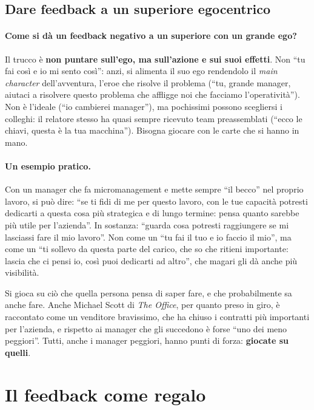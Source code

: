 \subsection{Dare feedback a un superiore egocentrico}

\paragraph{Come si dà un feedback negativo a un superiore con un grande ego?}
Il trucco è \textbf{non puntare sull'ego, ma sull'azione e sui suoi effetti}.
Non ``tu fai così e io mi sento così'': anzi, si alimenta il suo ego
rendendolo il \emph{main character} dell'avventura, l'eroe che risolve il
problema (``tu, grande manager, aiutaci a risolvere questo problema che
affligge noi che facciamo l'operatività''). Non è l'ideale (``io cambierei
manager''), ma pochissimi possono scegliersi i colleghi: il relatore stesso ha
quasi sempre ricevuto team preassemblati (``ecco le chiavi, questa è la tua
macchina''). Bisogna giocare con le carte che si hanno in mano.

\paragraph{Un esempio pratico.} Con un manager che fa micromanagement e mette
sempre ``il becco'' nel proprio lavoro, si può dire: ``se ti fidi di me per
questo lavoro, con le tue capacità potresti dedicarti a questa cosa più
strategica e di lungo termine: pensa quanto sarebbe più utile per l'azienda''.
In sostanza: ``guarda cosa potresti raggiungere se mi lasciassi fare il mio
lavoro''. Non come un ``tu fai il tuo e io faccio il mio'', ma come un
``ti sollevo da questa parte del carico, che so che ritieni importante: lascia
che ci pensi io, così puoi dedicarti ad altro'', che magari gli dà anche più
visibilità.

Si gioca su ciò che quella persona pensa di saper fare, e che probabilmente sa
anche fare. Anche Michael Scott di \emph{The Office}, per quanto preso in giro,
è raccontato come un venditore bravissimo, che ha chiuso i contratti più
importanti per l'azienda, e rispetto ai manager che gli succedono è forse
``uno dei meno peggiori''. Tutti, anche i manager peggiori, hanno punti di
forza: \textbf{giocate su quelli}.

\section{Il feedback come regalo}
\label{sec:z1-regalo}

